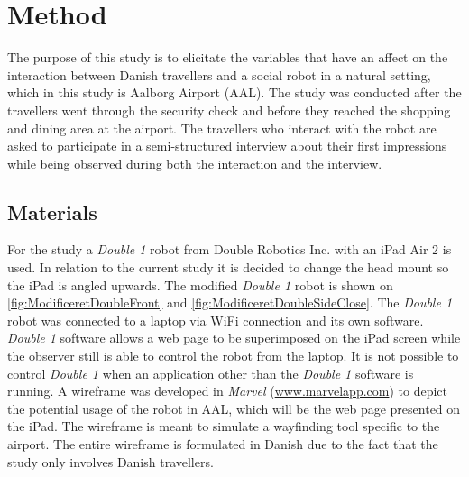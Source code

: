 \section{Method}
\label{Method}
%
The purpose of this study is to elicitate the variables that have an affect on the interaction between Danish travellers and a social robot in a natural setting, which in this study is Aalborg Airport (AAL). The study was conducted after the travellers went through the security check and before they reached the shopping and dining area at the airport. The travellers who interact with the robot are asked to participate in a semi-structured interview about their first impressions while being observed during both the interaction and the interview. 

\subsection{Materials}
For the study a \textit{Double 1} robot from Double Robotics Inc. with an iPad Air 2 is used. In relation to the current study it is decided to change the head mount so the iPad is angled upwards. The modified \textit{Double 1} robot is shown on \autoref{fig:ModificeretDoubleFront} and \autoref{fig:ModificeretDoubleSideClose}. The \textit{Double 1} robot was connected to a laptop via WiFi connection and its own software. \textit{Double 1} software allows a web page to be superimposed on the iPad screen while the observer still is able to control the robot from the laptop. It is not possible to control \textit{Double 1} when an application other than the \textit{Double 1} software is running. A wireframe was developed in \textit{Marvel} (\url{www.marvelapp.com}) to depict the potential usage of the robot in AAL, which will be the web page presented on the iPad. The wireframe is meant to simulate a wayfinding tool specific to the airport. The entire wireframe is formulated in Danish due to the fact that the study only involves Danish travellers.
%
